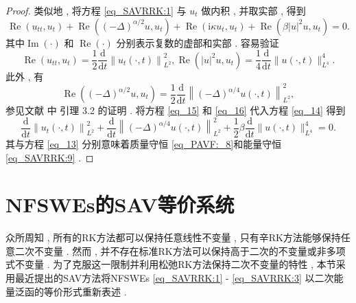 \begin{proof}
类似地 , 将方程 \eqref{eq_SAVRRK:1} 与 $u_{t}$ 做内积 , 并取实部 , 得到
\begin{equation}
\operatorname{Re}\left(u_{t t} , u_{t}\right)+\operatorname{Re}\left((-\Delta)^{\alpha / 2} u , u_{t}\right)+\operatorname{Re}\left(\mathrm{i} \kappa u_{t} , u_{t}\right)+\operatorname{Re}\left(\beta|u|^{2} u , u_{t}\right)=0  . 
\label{eq_14}\end{equation}
其中$\operatorname{Im}(\cdot)$ 和 $\operatorname{Re}(\cdot)$ 分别表示复数的虚部和实部 . 容易验证
\begin{equation}
\operatorname{Re}\left(u_{t t} , u_{t}\right)=\frac{1}{2} \frac{\mathrm{d}}{\mathrm{d} t}\left\|u_{t}(\cdot , t)\right\|_{L^{2}}^{2} , \operatorname{Re}\left(|u|^{2} u , u_{t}\right)=\frac{1}{4} \frac{\mathrm{d}}{\mathrm{d} t}\|u(\cdot , t)\|_{L^{4}}^{4}  . 
\label{eq_15}\end{equation}
此外 , 有
\begin{equation}
\operatorname{Re}\left((-\Delta)^{\alpha / 2} u , u_{t}\right)=\frac{1}{2} \frac{\mathrm{d}}{\mathrm{d} t}\left\|(-\Delta)^{\alpha / 4} u(\cdot , t)\right\|_{L^{2}}^{2} , 
\label{eq_16}\end{equation}
参见文献 \citep{guoExistenceGlobalSmooth2008}中 引理 3.2 的证明 . 
将方程 \eqref{eq_15} 和 \eqref{eq_16} 代入方程 \eqref{eq_14} 得到
\begin{equation}
\frac{\mathrm{d}}{\mathrm{d} t}\left\|u_{t}(\cdot , t)\right\|_{L^{2}}^{2}+\frac{\mathrm{d}}{\mathrm{d} t}\left\|(-\Delta)^{\alpha / 4} u(\cdot , t)\right\|_{L^{2}}^{2}+\frac{1}{2} \beta \frac{\mathrm{d}}{\mathrm{d} t}\|u(\cdot , t)\|_{L^{4}}^{4}=0  . 
\label{eq_17}\end{equation}
其与方程 \eqref{eq_13} 分别意味着质量守恒 \eqref{eq_PAVF:_8}和能量守恒 \eqref{eq_SAVRRK:9} . 

\end{proof}

\section{NFSWEs的SAV等价系统}\label{Section_SAVRRK: 2}

众所周知 , 所有的RK方法都可以保持任意线性不变量 , 只有辛RK方法能够保持任意二次不变量 . 
然而 , 并不存在标准RK方法可以保持高于二次的不变量或非多项式不变量 . 
为了克服这一限制并利用松弛RK方法保持二次不变量的特性 , 本节采用最近提出的SAV方法将NFSWEs \eqref{eq_SAVRRK:1} - \eqref{eq_SAVRRK:3} 以二次能量泛函的等价形式重新表述 . 

